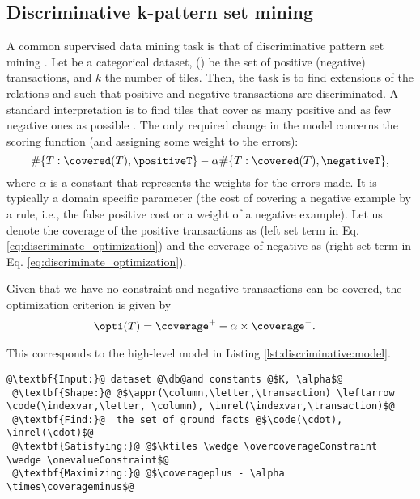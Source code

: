 \subsection{Discriminative k-pattern set mining}
\label{subsec:discriminative}
A common supervised data mining task is that of discriminative pattern set mining \citep{DBLP:conf/pkdd/KnobbeH06}.  Let \dbvars be a categorical dataset, \positiveT (\negativeT) be the set of positive (negative) transactions, and $ k$ the number of tiles. Then, the task is to find extensions of the relations \codevars and \invars such that positive and negative transactions are discriminated. A standard interpretation is to find tiles that cover as many positive and as few negative ones as possible \citep{Liu98integratingclassification}. The only required change in the model concerns the scoring function (and assigning some weight to the errors):
\begin{equation}
  \#\{T: \covered(T),\positiveT \} - \alpha \#\{ T: \covered(T),\negativeT \}, \label{eq:discriminate_optimization}
\end{equation}
where $\alpha$ is a constant that represents the weights for the errors made. It is typically a domain specific parameter (the cost of covering a negative example by a rule, i.e., the false
positive cost or a weight of a negative example).
Let us denote the coverage of the positive transactions as \coverageplus (left set term in Eq. \ref{eq:discriminate_optimization}) and the coverage of negative as \coverageminus (right set term in Eq. \ref{eq:discriminate_optimization}).  

Given that we have no \overcoverageConstraint constraint and negative transactions can be covered, the optimization criterion is given by
\begin{align*}
  & \opti(T) = \coverage^+ - \alpha \times \coverage^- .
\end{align*}

This corresponds to the high-level model in Listing \ref{lst:discriminative:model}.
\begin{lstlisting}[style=model,label=lst:discriminative:model,caption=ReDF Discriminative Patter Set Mining Model]
 @\textbf{Input:}@ dataset @\db@and constants @$K, \alpha$@
 @\textbf{Shape:}@ @$\appr(\column,\letter,\transaction) \leftarrow \code(\indexvar,\letter, \column), \inrel(\indexvar,\transaction)$@
 @\textbf{Find:}@  the set of ground facts @$\code(\cdot), \inrel(\cdot)$@
 @\textbf{Satisfying:}@ @$\ktiles \wedge \overcoverageConstraint \wedge \onevalueConstraint$@
 @\textbf{Maximizing:}@ @$\coverageplus - \alpha \times\coverageminus$@
\end{lstlisting}
